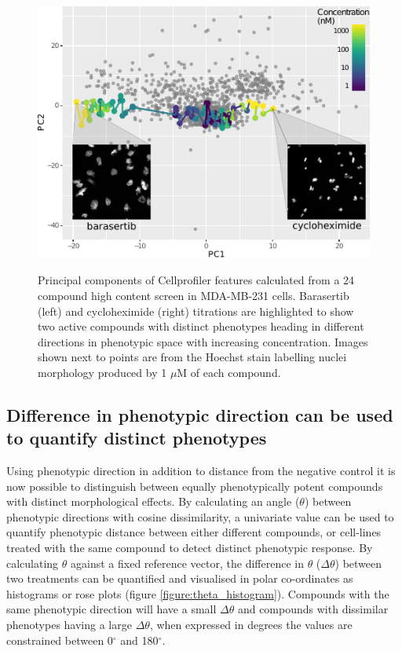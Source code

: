 \documentclass[a4paper,11pt,twoside,openright]{scrbook}
\begin{document}
\begin{figure}
    \captionsetup{width=0.8\textwidth}
    \caption[Two compound titrations highlighted in phenotypic space]{
Principal components of Cellprofiler features calculated from a 24 compound high content screen in MDA-MB-231 cells.
Barasertib (left) and cycloheximide (right) titrations are highlighted to show two active compounds with distinct 
phenotypes heading in different directions in phenotypic space with increasing concentration.
Images shown next to points are from the Hoechst stain labelling nuclei morphology produced by 1 $\mu$M of each 
compound.
}
    \includegraphics[scale=1.4]{figs/ch3TCCS_direction}
    \label{figure:pca_direction}
\end{figure}


\subsection{Difference in phenotypic direction can be used to quantify distinct phenotypes}

Using phenotypic direction in addition to distance from the negative control it is now possible to distinguish between 
equally phenotypically potent compounds with distinct morphological effects.
By calculating an angle ($\theta$) between phenotypic directions with cosine dissimilarity, a univariate value can be 
used to quantify phenotypic distance between either different compounds, or cell-lines treated with the same compound 
to detect distinct phenotypic response.
By calculating $\theta$ against a fixed reference vector, the difference in $\theta$  ($\Delta\theta$) between two 
treatments can be quantified and visualised in polar co-ordinates as histograms or rose plots (figure 
\ref{figure:theta_histogram}).
Compounds with the same phenotypic direction will have a small $\Delta\theta$ and compounds with dissimilar phenotypes 
having a large $\Delta\theta$, when expressed in degrees the values are constrained between 0$^\circ$ and 180$^\circ$.
\end{document}
